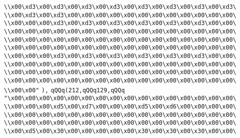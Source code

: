 \verb|\\x00\xd3\x00\xd3\x00\xd3\x00\xd3\x00\xd3\x00\xd3\x00\xd3\x00\xd3\|\newline
\verb|\\x00\xd3\x00\xd3\x00\x00\x00\x00\x00\x00\x00\x00\x00\x00\x00\x00\|\newline
\verb|\\x00\x00\x00\xd3\x00\xd3\x00\xd3\x00\xd3\x00\xd3\x00\xd3\x00\x00\|\newline
\verb|\\x00\x00\x00\x00\x00\x00\x00\x00\x00\x00\x00\x00\x00\x00\x00\x00\|\newline
\verb|\\x00\x00\x00\x00\x00\x00\x00\x00\x00\x00\x00\x00\x00\x00\x00\x00\|\newline
\verb|\\x00\x00\x00\x00\x00\x00\x00\x00\x00\x00\x00\x00\x00\x00\x00\x00\|\newline
\verb|\\x00\x00\x00\xd3\x00\xd3\x00\xd3\x00\xd3\x00\xd3\x00\xd3\x00\x00\|\newline
\verb|\\x00\x00\x00\x00\x00\x00\x00\x00\x00\x00\x00\x00\x00\x00\x00\x00\|\newline
\verb|\\x00\x00\x00\x00\x00\x00\x00\x00\x00\x00\x00\x00\x00\x00\x00\x00\|\newline
\verb|\\x00\x00\x00\x00\x00\x00\x00\x00\x00\x00\x00\x00\x00\x00\x00\x00\|\newline
\verb|\\x00\x00"|\newline
\verb|),|\newline
\verb|qQQq(212,qQQq129,qQQq|\newline
\verb|"\x00\x00\x00\x00\x00\x00\x00\x00\x00\x00\x00\x00\x00\x00\x00\x00\|\newline
\verb|\\x00\x00\x00\xd5\x00\xd7\x00\x00\x00\xd5\x00\xd6\x00\x00\x00\x00\|\newline
\verb|\\x00\x00\x00\x00\x00\x00\x00\x00\x00\x00\x00\x00\x00\x00\x00\x00\|\newline
\verb|\\x00\x00\x00\x00\x00\x00\x00\x00\x00\x00\x00\x00\x00\x00\x00\x00\|\newline
\verb|\\x00\xd5\x00\x30\x00\x00\x00\x00\x00\x30\x00\x30\x00\x30\x00\x00\|\newline
